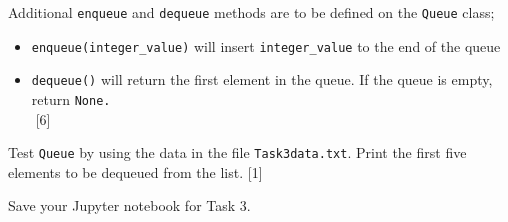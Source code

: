 Additional \texttt{enqueue} and \texttt{dequeue} methods are to be
defined on the \texttt{Queue} class;
\begin{itemize}
\item \texttt{enqueue(integer\_value)} will insert \texttt{integer\_value}
to the end of the queue
\item \texttt{dequeue()} will return the first element in the queue. If
the queue is empty, return \texttt{None.} \\
\textcolor{white}{.}\hfill{}{[}6{]}
\end{itemize}
Test \texttt{Queue} by using the data in the file \texttt{Task3data.txt}.
Print the first five elements to be dequeued from the list. \hfill{}{[}1{]}

Save your Jupyter notebook for Task 3.